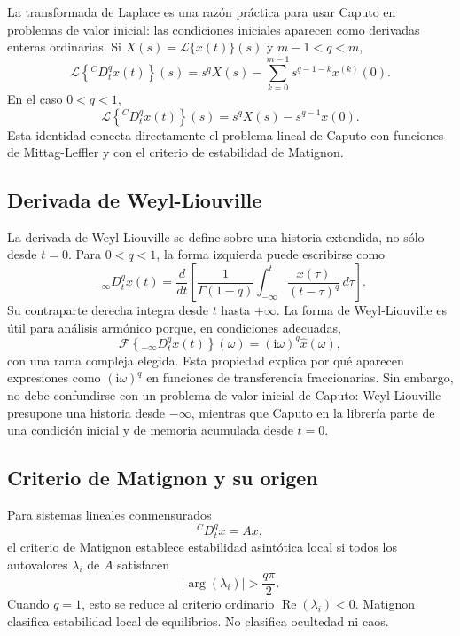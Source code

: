 \documentclass[11pt]{article}
\newcommand{\ii}{\mathrm{i}}
\begin{document}
La transformada de Laplace es una razón práctica para usar Caputo en
problemas de valor inicial: las condiciones iniciales aparecen como derivadas
enteras ordinarias. Si \(X(s)=\mathcal{L}\{x(t)\}(s)\) y \(m-1<q<m\),
\begin{equation}
\mathcal{L}\left\{{}^{C}D_t^q x(t)\right\}(s)
=
s^q X(s)-
\sum_{k=0}^{m-1}s^{q-1-k}x^{(k)}(0).
\label{eq:caputo_laplace_general}
\end{equation}
En el caso \(0<q<1\),
\begin{equation}
\mathcal{L}\left\{{}^{C}D_t^q x(t)\right\}(s)
=s^q X(s)-s^{q-1}x(0).
\label{eq:caputo_laplace_q01}
\end{equation}
Esta identidad conecta directamente el problema lineal de Caputo con
funciones de Mittag-Leffler y con el criterio de estabilidad de Matignon.

\subsection{Derivada de Weyl-Liouville}

La derivada de Weyl-Liouville se define sobre una historia extendida, no
sólo desde \(t=0\). Para \(0<q<1\), la forma izquierda puede escribirse como
\begin{equation}
{}_{-\infty}D_t^q x(t)=
\frac{d}{dt}
\left[
\frac{1}{\Gamma(1-q)}
\int_{-\infty}^{t}\frac{x(\tau)}{{\left(t-\tau\right)}^q}\,d\tau
\right].
\label{eq:weyl_liouville_left}
\end{equation}
Su contraparte derecha integra desde \(t\) hasta \(+\infty\). La forma de
Weyl-Liouville es útil para análisis armónico porque, en condiciones
adecuadas,
\[
\mathcal{F}\left\{{}_{-\infty}D_t^q x(t)\right\}(\omega)
= {\left(\ii\omega\right)}^q\widehat{x}(\omega),
\]
con una rama compleja elegida. Esta propiedad explica por qué aparecen
expresiones como \({\left(\ii\omega\right)}^q\) en funciones de transferencia
fraccionarias. Sin embargo, no debe confundirse con un problema de valor
inicial de Caputo: Weyl-Liouville presupone una historia desde
\(-\infty\), mientras que Caputo en la librería parte de una condición inicial
y de memoria acumulada desde \(t=0\).

\subsection{Criterio de Matignon y su origen}

Para sistemas lineales conmensurados
\[
{}^{C}D_t^q x = A x,
\]
el criterio de Matignon \cite{Matignon1996} establece estabilidad asintótica local si todos los
autovalores \(\lambda_i\) de \(A\) satisfacen
\[
|\arg(\lambda_i)|>\frac{q\pi}{2}.
\]
Cuando \(q=1\), esto se reduce al criterio ordinario
\(\operatorname{Re}(\lambda_i)<0\). Matignon clasifica estabilidad local de
equilibrios. No clasifica ocultedad ni caos.
\end{document}
